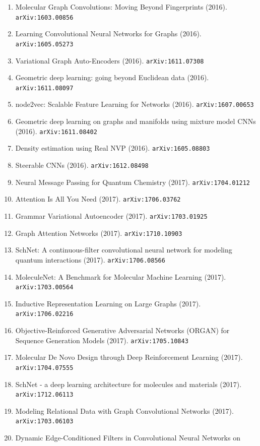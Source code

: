 \documentclass[11pt]{article}
\begin{document}
\begin{enumerate}
  \item Molecular Graph Convolutions: Moving Beyond Fingerprints (2016). \texttt{arXiv:1603.00856}
  \item Learning Convolutional Neural Networks for Graphs (2016). \texttt{arXiv:1605.05273}
  \item Variational Graph Auto-Encoders (2016). \texttt{arXiv:1611.07308}
  \item Geometric deep learning: going beyond Euclidean data (2016). \texttt{arXiv:1611.08097}
  \item node2vec: Scalable Feature Learning for Networks (2016). \texttt{arXiv:1607.00653}
  \item Geometric deep learning on graphs and manifolds using mixture model CNNs (2016). \texttt{arXiv:1611.08402}
  \item Density estimation using Real NVP (2016). \texttt{arXiv:1605.08803}
  \item Steerable CNNs (2016). \texttt{arXiv:1612.08498}
  \item Neural Message Passing for Quantum Chemistry (2017). \texttt{arXiv:1704.01212}
  \item Attention Is All You Need (2017). \texttt{arXiv:1706.03762}
  \item Grammar Variational Autoencoder (2017). \texttt{arXiv:1703.01925}
  \item Graph Attention Networks (2017). \texttt{arXiv:1710.10903}
  \item SchNet: A continuous-filter convolutional neural network for modeling
  quantum interactions (2017). \texttt{arXiv:1706.08566}
  \item MoleculeNet: A Benchmark for Molecular Machine Learning (2017). \texttt{arXiv:1703.00564}
  \item Inductive Representation Learning on Large Graphs (2017). \texttt{arXiv:1706.02216}
  \item Objective-Reinforced Generative Adversarial Networks (ORGAN) for
  Sequence Generation Models (2017). \texttt{arXiv:1705.10843}
  \item Molecular De Novo Design through Deep Reinforcement Learning (2017). \texttt{arXiv:1704.07555}
  \item SchNet - a deep learning architecture for molecules and materials (2017). \texttt{arXiv:1712.06113}
  \item Modeling Relational Data with Graph Convolutional Networks (2017). \texttt{arXiv:1703.06103}
  \item Dynamic Edge-Conditioned Filters in Convolutional Neural Networks on

\end{enumerate}
\end{document}
